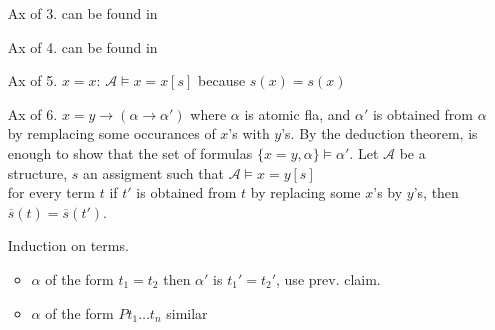 {\begin{enumerate}
\begin{enumerate}
                then in particular $\mathcal{A}\models \varphi [s(x|\overline{s}(t))]$ and
                by the substitution lemma we have the equivalence to $\mathcal{A}\models \varphi^x_t\:[s]$
            \item[Ax of 3.] can be found in \cite*[exercise 3, section 2.2]{EndertonHerbertB2001AMIt} 
            \item[Ax of 4.] can be found in \cite*[exercise 4, section 2.2]{EndertonHerbertB2001AMIt} 
            \item[Ax of 5.] $x=x$: $\mathcal{A}\models x = x[s]$ because $s(x) = s(x)$
            \item[Ax of 6.] $x=y \to (\alpha \to \alpha')$ where $\alpha$ is atomic fla, and $\alpha'$ is obtained from $\alpha$ by remplacing some occurances of $x$'s with $y$'s.
                By the deduction theorem, is enough to show that the set of formulas $\{x=y, \alpha\}\models \alpha'$.
                Let $\mathcal{A}$ be a structure, $s$ an assigment such that $\mathcal{A}\models x=y [s]$\\
                 for every term $t$ if $t'$ is obtained from $t$ by replacing some $x$'s by $y$'s, then $\overline{s}(t) = \overline{s}(t')$.
                \begin{claimproof}
                    Induction on terms.
                \end{claimproof}
                \begin{itemize}
                    \item $\alpha$ of the form $t_1 = t_2$ then $\alpha'$ is $t_1' =t_2'$, use prev. claim.
                    \item $\alpha$ of the form $P t_1 \dots t_n$ similar
                \end{itemize}
        \end{enumerate}
    \end{enumerate}
}


